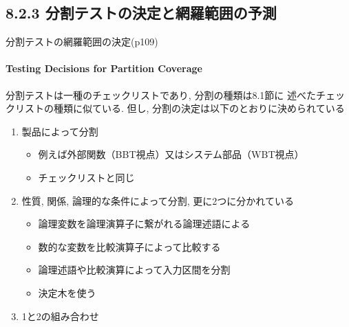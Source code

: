 \subsection{8.2.3 分割テストの決定と網羅範囲の予測}
\begin{frame}{分割テストの網羅範囲の決定(p109)}
\framesubtitle{Testing Decisions for Partition Coverage}
分割テストは一種のチェックリストであり, 分割の種類は8.1節に
述べたチェックリストの種類に似ている. 
但し, 分割の決定は以下のとおりに決められている
\begin{enumerate}
\item 製品によって分割
    \begin{itemize}
    \item 例えば外部関数（BBT視点）又はシステム部品（WBT視点）
    \item<uncover@2-|alert@2>
    チェックリストと同じ
    \end{itemize}
\item 性質, 関係, 論理的な条件によって分割, 更に2つに分かれている
    \begin{itemize}
    \item 論理変数を論理演算子に繋がれる論理述語による 
    \item 数的な変数を比較演算子によって比較する
    \item<uncover@3-|alert@3>
    論理述語や比較演算によって入力区間を分割
    \item<uncover@4-|alert@4>
    決定木を使う
    \end{itemize}
\item 1と2の組み合わせ 
\end{enumerate}
\end{frame}
